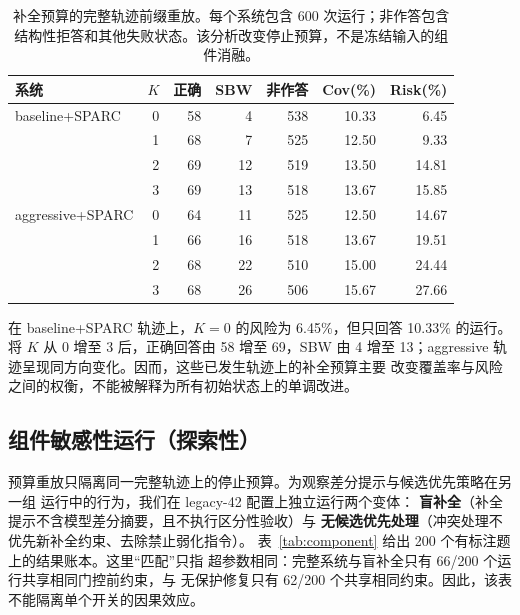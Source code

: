 \documentclass[letterpaper]{article}
\newcommand{\method}{SPARC}
\newcommand{\sbw}{SBW}
\begin{document}
\begin{table}[ht]
  \centering
  \caption{补全预算的完整轨迹前缀重放。每个系统包含 600 次运行；非作答包含
  结构性拒答和其他失败状态。该分析改变停止预算，不是冻结输入的组件消融。}
  \label{tab:ablation}
  \small
  \begin{tabular}{lrrrrrr}
    \toprule
    系统 & $K$ & 正确 & \sbw{} & 非作答 & Cov(\%) & Risk(\%) \\
    \midrule
    baseline+\method   & 0 & 58 & 4  & 538 & 10.33 & 6.45 \\
                         & 1 & 68 & 7  & 525 & 12.50 & 9.33 \\
                         & 2 & 69 & 12 & 519 & 13.50 & 14.81 \\
                         & 3 & 69 & 13 & 518 & 13.67 & 15.85 \\
    \midrule
    aggressive+\method & 0 & 64 & 11 & 525 & 12.50 & 14.67 \\
                         & 1 & 66 & 16 & 518 & 13.67 & 19.51 \\
                         & 2 & 68 & 22 & 510 & 15.00 & 24.44 \\
                         & 3 & 68 & 26 & 506 & 15.67 & 27.66 \\
    \bottomrule
  \end{tabular}
\end{table}

在 baseline+\method{} 轨迹上，$K=0$ 的风险为 6.45\%，但只回答 10.33\%
的运行。将 $K$ 从 0 增至 3 后，正确回答由 58 增至 69，\sbw{} 由 4 增至
13；aggressive 轨迹呈现同方向变化。因而，这些已发生轨迹上的补全预算主要
改变覆盖率与风险之间的权衡，不能被解释为所有初始状态上的单调改进。

\subsection{组件敏感性运行（探索性）}

预算重放只隔离同一完整轨迹上的停止预算。为观察差分提示与候选优先策略在另一组
运行中的行为，我们在 legacy-42 配置上独立运行两个变体：
\textbf{盲补全}（补全提示不含模型差分摘要，且不执行区分性验收）与
\textbf{无候选优先处理}（冲突处理不优先新补全约束、去除禁止弱化指令）。
表~\ref{tab:component} 给出 200 个有标注题上的结果账本。这里“匹配”只指
超参数相同：完整系统与盲补全只有 66/200 个运行共享相同门控前约束，与
无保护修复只有 62/200 个共享相同约束。因此，该表不能隔离单个开关的因果效应。
\end{document}
